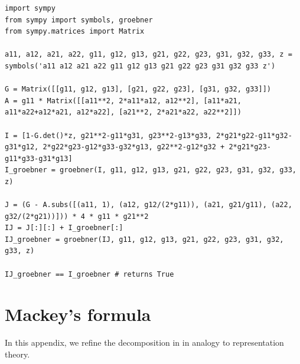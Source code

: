 \documentclass[11pt,reqno]{amsart}
\theoremstyle{definition}
\begin{document}
\begin{verbatim}
import sympy
from sympy import symbols, groebner
from sympy.matrices import Matrix

a11, a12, a21, a22, g11, g12, g13, g21, g22, g23, g31, g32, g33, z = symbols('a11 a12 a21 a22 g11 g12 g13 g21 g22 g23 g31 g32 g33 z')

G = Matrix([[g11, g12, g13], [g21, g22, g23], [g31, g32, g33]]) 
A = g11 * Matrix([[a11**2, 2*a11*a12, a12**2], [a11*a21, a11*a22+a12*a21, a12*a22], [a21**2, 2*a21*a22, a22**2]])

I = [1-G.det()*z, g21**2-g11*g31, g23**2-g13*g33, 2*g21*g22-g11*g32-g31*g12, 2*g22*g23-g12*g33-g32*g13, g22**2-g12*g32 + 2*g21*g23-g11*g33-g31*g13]
I_groebner = groebner(I, g11, g12, g13, g21, g22, g23, g31, g32, g33, z)

J = (G - A.subs([(a11, 1), (a12, g12/(2*g11)), (a21, g21/g11), (a22, g32/(2*g21))])) * 4 * g11 * g21**2
IJ = J[:][:] + I_groebner[:]
IJ_groebner = groebner(IJ, g11, g12, g13, g21, g22, g23, g31, g32, g33, z)

IJ_groebner == I_groebner # returns True
\end{verbatim}

\section{Mackey's formula}
\label{appendix:mackey-formula}
In this appendix, we refine the decomposition in  in analogy to representation theory.
\end{document}
